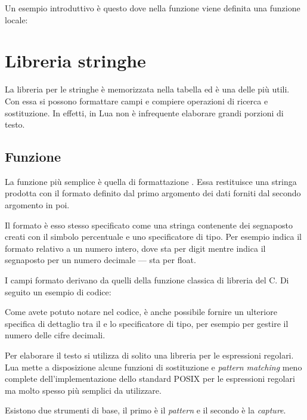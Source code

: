 Un esempio introduttivo è questo dove nella funzione  viene definita una
funzione locale:


\section{Libreria stringhe}

La libreria per le stringhe è memorizzata nella tabella  ed è una
delle più utili. Con essa si possono formattare campi e compiere operazioni di
ricerca e sostituzione. In effetti, in Lua non è infrequente elaborare grandi
porzioni di testo.


\subsection{Funzione }
\label{secFondStringFormat}

La funzione più semplice è quella di formattazione . Essa
restituisce una stringa prodotta con il formato definito dal primo argomento
dei dati forniti dal secondo argomento in poi.

Il formato è esso stesso specificato come una stringa contenente dei segnaposto
creati con il simbolo percentuale e uno specificatore di tipo. Per esempio
 indica il formato relativo a un numero intero, dove  sta per
digit mentre  indica il segnaposto per un numero decimale --- 
sta per float.

I campi formato derivano da quelli della funzione classica di libreria
 del C. Di seguito un esempio di codice:

Come avete potuto notare nel codice, è anche possibile fornire un ulteriore
specifica di dettaglio tra il \key{\%} e lo specificatore di tipo, per esempio
per gestire il numero delle cifre decimali.

Per elaborare il testo si utilizza di solito una libreria per le espressioni
regolari. Lua mette a disposizione alcune funzioni di sostituzione e
\emph{pattern matching} meno complete dell'implementazione dello standard
POSIX per le espressioni regolari ma molto spesso più semplici da utilizzare.

Esistono due strumenti di base, il primo è il \emph{pattern} e il secondo è la
\emph{capture}.



